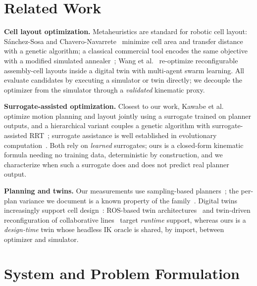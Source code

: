 \documentclass[conference]{IEEEtran}
\begin{document}
\section{Related Work}
\label{sec:related}
\textbf{Cell layout optimization.} Metaheuristics are standard for robotic cell layout:
S\'anchez-Sosa and Chavero-Navarrete~\cite{sanchez} minimize cell area and transfer distance
with a genetic algorithm; a classical commercial tool encodes the same objective with a modified
simulated annealer~\cite{barral}; Wang et al.~\cite{wang} re-optimize reconfigurable
assembly-cell layouts inside a digital twin with multi-agent swarm learning. All evaluate
candidates by executing a simulator or twin directly; we decouple the optimizer from the
simulator through a \emph{validated} kinematic proxy.

\textbf{Surrogate-assisted optimization.} Closest to our work, Kawabe et
al.~\cite{kawabe} optimize motion planning and layout jointly using a surrogate trained on
planner outputs, and a hierarchical variant couples a genetic algorithm with surrogate-assisted
RRT~\cite{kaimujjaman}; surrogate assistance is well established in evolutionary
computation~\cite{surrogatesurvey}. Both rely on \emph{learned} surrogates; ours is a
closed-form kinematic formula needing no training data, deterministic by construction, and we
characterize when such a surrogate does and does not predict real planner output.

\textbf{Planning and twins.} Our measurements use sampling-based
planners~\cite{rrtconnect,rrtstar,prm}; the per-plan variance we document is a known property of
the family~\cite{lavalle}. Digital twins increasingly support cell design~\cite{dtsurvey}:
ROS-based twin architectures~\cite{sueldo} and twin-driven reconfiguration of collaborative
lines~\cite{kousi} target \emph{runtime} support, whereas ours is a \emph{design-time} twin
whose headless IK oracle is shared, by import, between optimizer and simulator.

\section{System and Problem Formulation}
\label{sec:system}
\end{document}

